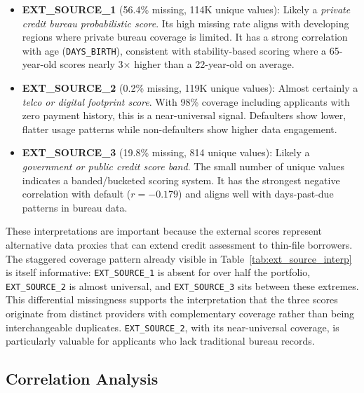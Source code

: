 \begin{itemize}
    \item \textbf{EXT\_SOURCE\_1} (56.4\% missing, 114K unique values): Likely a \textit{private credit bureau probabilistic score}. Its high missing rate aligns with developing regions where private bureau coverage is limited. It has a strong correlation with age (\texttt{DAYS\_BIRTH}), consistent with stability-based scoring where a 65-year-old scores nearly 3$\times$ higher than a 22-year-old on average.

    \item \textbf{EXT\_SOURCE\_2} (0.2\% missing, 119K unique values): Almost certainly a \textit{telco or digital footprint score}. With 98\% coverage including applicants with zero payment history, this is a near-universal signal. Defaulters show lower, flatter usage patterns while non-defaulters show higher data engagement.

    \item \textbf{EXT\_SOURCE\_3} (19.8\% missing, 814 unique values): Likely a \textit{government or public credit score band}. The small number of unique values indicates a banded/bucketed scoring system. It has the strongest negative correlation with default ($r = -0.179$) and aligns well with days-past-due patterns in bureau data.
\end{itemize}

These interpretations are important because the external scores represent alternative data proxies that can extend credit assessment to thin-file borrowers. The staggered coverage pattern already visible in Table~\ref{tab:ext_source_interp} is itself informative: \texttt{EXT\_SOURCE\_1} is absent for over half the portfolio, \texttt{EXT\_SOURCE\_2} is almost universal, and \texttt{EXT\_SOURCE\_3} sits between these extremes. This differential missingness supports the interpretation that the three scores originate from distinct providers with complementary coverage rather than being interchangeable duplicates. \texttt{EXT\_SOURCE\_2}, with its near-universal coverage, is particularly valuable for applicants who lack traditional bureau records.

\subsection{Correlation Analysis}
\label{subsec:correlation_eda}



